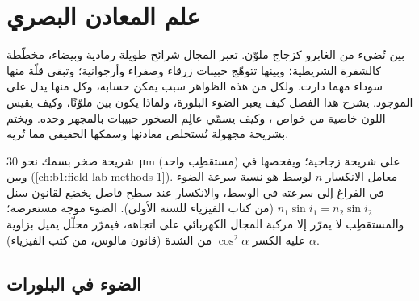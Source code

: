 \chapter{علم المعادن البصري}\label{ch:b1:optical-mineralogy}

بين  تُضيء  من الغابرو كزجاج ملوّن. تعبر المجال شرائح طويلة رمادية وبيضاء، مخطّطة كالشفرة الشريطية؛ وبينها تتوهّج حبيبات زرقاء وصفراء وأرجوانية؛ وتبقى قلّة منها سوداء مهما دارت. ولكل من هذه الظواهر سبب يمكن حسابه، وكل منها يدل على  الموجود. يشرح هذا الفصل كيف يعبر الضوء البلورة، ولماذا يكون  بين  ملوّنًا، وكيف يقيس اللون خاصية من خواص ، وكيف يسمّي عالِم الصخور حبيبات  بالمجهر وحده. ويختم بشريحة مجهولة تُستخلص معادنها وسمكها الحقيقي مما تُريه.

\begin{recall}
 شريحة صخر بسمك نحو \qty{30}{\micro m} على شريحة زجاجية؛ ويفحصها  في  (مستقطِب واحد) وبين  (\cref{ch:b1:field-lab-methods-1}). معامل الانكسار $n$ لوسط هو نسبة سرعة الضوء في الفراغ إلى سرعته في الوسط، والانكسار عند سطح فاصل يخضع لقانون سنل $n_1\sin i_1 = n_2\sin i_2$ (من كتاب الفيزياء للسنة الأولى). الضوء موجة مستعرضة؛ والمستقطِب لا يمرّر إلا مركبة المجال الكهربائي على اتجاهه، فيمرّر محلّل يميل بزاوية $\alpha$ عليه الكسر $\cos^2\alpha$ من الشدة (قانون مالوس، من كتب الفيزياء).
\end{recall}

\section{الضوء في البلورات}

